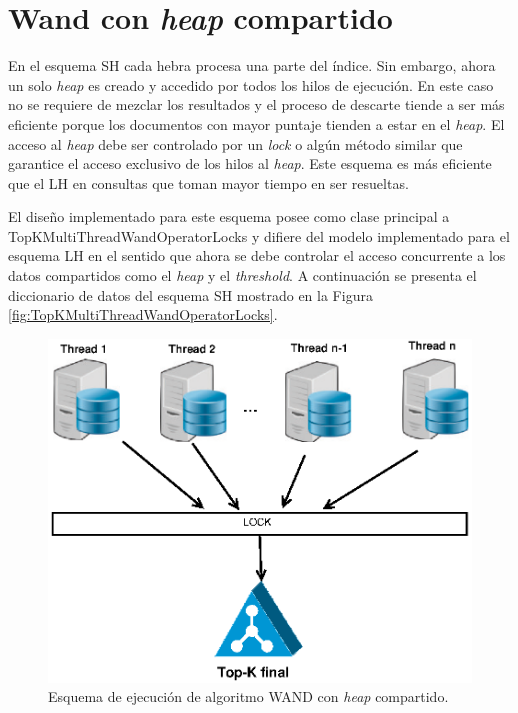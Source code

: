 \section{Wand con \textit{heap} compartido}
\label{scheduling:whc}
En el esquema SH cada hebra procesa una parte del índice. Sin embargo, ahora un solo \textit{heap} es creado y accedido por todos los hilos de ejecución. En este caso no se requiere de mezclar los resultados y el proceso de descarte tiende a ser más eficiente porque los documentos con mayor puntaje tienden a estar en el \textit{heap}. El acceso al \textit{heap} debe ser controlado por un \textit{lock} o algún método similar que garantice el acceso exclusivo de los hilos al \textit{heap}. Este esquema es más eficiente que el LH en consultas que toman mayor tiempo en ser resueltas.

El diseño implementado para este esquema posee como clase principal a TopKMultiThreadWandOperatorLocks y difiere del modelo implementado para el esquema LH en el sentido que ahora se debe controlar el acceso concurrente a los datos compartidos como el \textit{heap} y el \textit{threshold}. A continuación se presenta el diccionario de datos del esquema SH mostrado en la Figura \ref{fig:TopKMultiThreadWandOperatorLocks}.

\begin{figure}[tp]
\centering
\includegraphics[scale=.75]{images/wand_heaps_compartido.eps}
\caption{Esquema de ejecución de algoritmo WAND con \textit{heap} compartido.}
\label{fig:wand-heap-compartido}
\end{figure}

